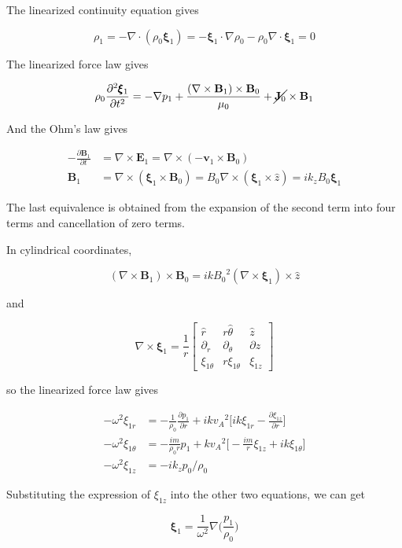 \documentclass[
  notoc %
]{tufte-book}
\begin{document}
The linearized continuity equation gives

\[
\rho_1 = -\nabla\cdot(\rho_0\pmb{\xi}_1)=-\pmb{\xi}_1 \cdot\nabla\rho_0 - \rho_0\nabla\cdot\pmb{\xi}_1 =0
\]

The linearized force law gives

\[
\rho_0\frac{\partial^2\pmb{\xi}_1}{\partial t^2} = -\nabla p_1 +\frac{(\nabla\times\mathbf{B}_1)\times\mathbf{B}_0}{\mu_0} +\cancel{\mathbf{J}_0}\times\mathbf{B}_1
\]

And the Ohm's law gives

\[
\begin{aligned}
-\frac{\partial \mathbf{B}_1}{\partial t} &= \nabla\times\mathbf{E}_1 = \nabla\times(-\mathbf{v}_1\times\mathbf{B}_0) \\
\mathbf{B}_1 &= \nabla\times(\pmb{\xi}_1\times\mathbf{B}_0)=B_0 \nabla\times(\pmb{\xi}_1\times\hat{z})=ik_z B_0\pmb{\xi}_1
\end{aligned}
\]

The last equivalence is obtained from the expansion of the second term
into four terms and cancellation of zero terms.

In cylindrical coordinates,

\[
(\nabla\times\mathbf{B}_1)\times\mathbf{B}_0 = ik{B_0}^2 (\nabla\times\pmb{\xi}_1)\times\hat{z}
\]

and

\[
\nabla\times\pmb{\xi}_1=\frac{1}{r}
\begin{bmatrix}
\hat{r} & r\hat{\theta} &\hat{z} \\
\partial_r & \partial_\theta & \partial z \\
\xi_{1\theta} & r\xi_{1\theta} & \xi_{1z}
\end{bmatrix}
\]

so the linearized force law gives

\[
\begin{aligned}
-\omega^2 \xi_{1r} &= -\frac{1}{\rho_0}\frac{\partial p_1}{\partial r} +ik{v_A}^2 \big[ ik\xi_{1r} - \frac{\partial \xi_{1z}}{\partial r}\big] \\
-\omega^2 \xi_{1\theta} &= -\frac{im}{\rho_0 r}p_1 + k{v_A}^2 \big[ -\frac{im}{r}\xi_{1z} + ik\xi_{1\theta} \big] \\
-\omega^2 \xi_{1z}&= -ik_z p_0/\rho_0
\end{aligned}
\]

Substituting the expression of \(\xi_{1z}\) into the other two
equations, we can get

\[
\pmb{\xi}_1 = \frac{1}{\omega^2}\nabla\big( \frac{p_1}{\rho_0} \big)
\]
\end{document}
